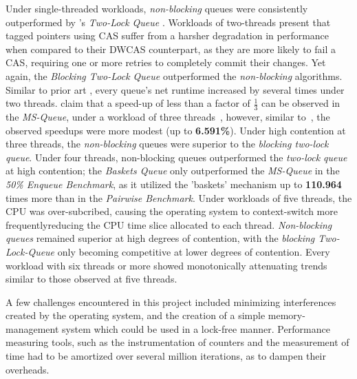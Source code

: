 Under single-threaded workloads, \emph{non-blocking} queues were consistently
outperformed by \citeauthor{michael1996simple}'s \emph{Two-Lock Queue}
\citep{michael1996simple}.
Workloads of two-threads present that tagged pointers using CAS suffer from a
harsher degradation in performance when compared to their DWCAS counterpart, as
they are more likely to fail a CAS, requiring one or more retries to completely
commit their changes. Yet again, the \emph{Blocking Two-Lock Queue}
outperformed the \emph{non-blocking} algorithms. 
Similar to prior art
\citep{hoffman2007baskets,michael1996simple,ladan2008optimistic}, every queue's
net runtime increased by several times under two threads.
\citeauthor{michael1996simple} claim that a speed-up of less than a factor of
$\frac{1}{3}$ can be observed in the \emph{MS-Queue}, under a workload of three threads~\citep{michael1996simple},
however, similar to~\citep{ladan2008optimistic,hoffman2007baskets}, the
observed speedups were more modest (up to \textbf{6.591\%}).
Under high contention at three threads, the \emph{non-blocking} queues were
superior to the \emph{blocking two-lock queue}. 
Under four threads, non-blocking queues outperformed the \emph{two-lock queue} at
high contention; the \emph{Baskets Queue} only outperformed the \emph{MS-Queue}
in the \emph{50\% Enqueue Benchmark}, as it utilized the 'baskets' mechanism up
to \textbf{110.964} times more than in the \emph{Pairwise Benchmark}. Under
workloads of five threads, the CPU was over-subcribed, causing the operating
system to context-switch more frequently\textemdash reducing the CPU time slice
allocated to each thread. \emph{Non-blocking queues} remained superior at high
degrees of contention, with the \emph{blocking Two-Lock-Queue} only becoming
competitive at lower degrees of contention. Every workload with six threads or
more showed monotonically attenuating trends similar to those observed at five
threads.

A few challenges encountered in this project included minimizing interferences
created by the operating system, and the creation of a simple memory-management
system which could be used in a lock-free manner.
Performance measuring tools, such as the instrumentation of counters and the
measurement of time had to be amortized over several million iterations, as to
dampen their overheads.